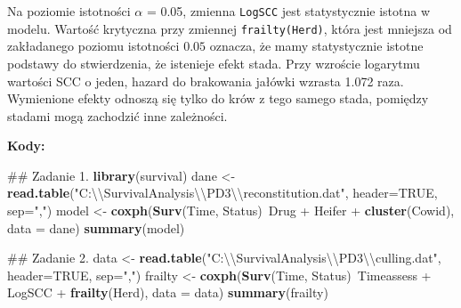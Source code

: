 \documentclass[]{article}
\newenvironment{Shaded}{}{}
\newcommand{\KeywordTok}[1]{\textcolor[rgb]{0.00,0.44,0.13}{\textbf{{#1}}}}
\newcommand{\DataTypeTok}[1]{\textcolor[rgb]{0.56,0.13,0.00}{{#1}}}
\newcommand{\CharTok}[1]{\textcolor[rgb]{0.25,0.44,0.63}{{#1}}}
\newcommand{\StringTok}[1]{\textcolor[rgb]{0.25,0.44,0.63}{{#1}}}
\newcommand{\OtherTok}[1]{\textcolor[rgb]{0.00,0.44,0.13}{{#1}}}
\newcommand{\NormalTok}[1]{{#1}}
\begin{document}
Na poziomie istotności \(\alpha\) = 0.05, zmienna \texttt{LogSCC} jest
statystycznie istotna w modelu. Wartość krytyczna przy zmiennej
\texttt{frailty(Herd)}, która jest mniejsza od zakładanego poziomu
istotności \(0.05\) oznacza, że mamy statystycznie istotne podstawy do
stwierdzenia, że istenieje efekt stada. Przy wzroście logarytmu wartości
SCC o jeden, hazard do brakowania jałówki wzrasta 1.072 raza. Wymienione
efekty odnoszą się tylko do krów z tego samego stada, pomiędzy stadami
mogą zachodzić inne zależności.

\newpage
\textbf{Kody:}

\begin{Shaded}
\begin{Highlighting}[]
\NormalTok{## Zadanie 1.}
\KeywordTok{library}\NormalTok{(survival)}
\NormalTok{dane <-}\StringTok{ }\KeywordTok{read.table}\NormalTok{(}\StringTok{"C:}\CharTok{\textbackslash{}\textbackslash{}}\StringTok{SurvivalAnalysis}\CharTok{\textbackslash{}\textbackslash{}}\StringTok{PD3}\CharTok{\textbackslash{}\textbackslash{}}\StringTok{reconstitution.dat"}\NormalTok{, }\DataTypeTok{header=}\OtherTok{TRUE}\NormalTok{, }\DataTypeTok{sep=}\StringTok{","}\NormalTok{)}
\NormalTok{model <-}\StringTok{ }\KeywordTok{coxph}\NormalTok{(}\KeywordTok{Surv}\NormalTok{(Time, Status)~Drug +}\StringTok{ }\NormalTok{Heifer +}\StringTok{ }\KeywordTok{cluster}\NormalTok{(Cowid), }\DataTypeTok{data =} \NormalTok{dane) }
\KeywordTok{summary}\NormalTok{(model)}

\NormalTok{## Zadanie 2.}
\NormalTok{data <-}\StringTok{ }\KeywordTok{read.table}\NormalTok{(}\StringTok{"C:}\CharTok{\textbackslash{}\textbackslash{}}\StringTok{SurvivalAnalysis}\CharTok{\textbackslash{}\textbackslash{}}\StringTok{PD3}\CharTok{\textbackslash{}\textbackslash{}}\StringTok{culling.dat"}\NormalTok{, }\DataTypeTok{header=}\OtherTok{TRUE}\NormalTok{, }\DataTypeTok{sep=}\StringTok{","}\NormalTok{)}
\NormalTok{frailty <-}\StringTok{ }\KeywordTok{coxph}\NormalTok{(}\KeywordTok{Surv}\NormalTok{(Time, Status)~Timeassess +}\StringTok{ }\NormalTok{LogSCC +}\StringTok{ }\KeywordTok{frailty}\NormalTok{(Herd), }\DataTypeTok{data =} \NormalTok{data)}
\KeywordTok{summary}\NormalTok{(frailty)}
\end{Highlighting}
\end{Shaded}
\end{document}
